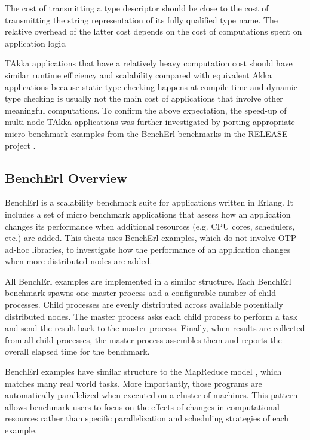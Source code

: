 \newpage

The cost of transmitting a type descriptor should be close to the cost of 
transmitting the string representation of its fully qualified type name.  The 
relative overhead of the latter cost depends on the cost of computations 
spent on application logic.

TAkka applications that have a relatively heavy computation cost should have 
similar runtime efficiency and scalability compared with equivalent Akka 
applications because static type checking happens at compile time and dynamic 
type checking is usually not the main cost of applications that involve other 
meaningful computations.  To confirm the above expectation, the speed-up of 
multi-node TAkka applications was further investigated by porting 
appropriate micro benchmark examples from the BenchErl benchmarks in the 
RELEASE project \citep{RELEASE, aronis2012scalability}. 


\subsection{BenchErl Overview}
\label{bencherl_overview}

BenchErl \citep{RELEASE, aronis2012scalability} is a scalability benchmark suite 
for applications written in Erlang.  It includes a set of micro benchmark 
applications that assess how an application changes its performance when 
additional resources (e.g. CPU cores, schedulers, etc.) are added.  This thesis 
uses BenchErl examples, which do not involve OTP ad-hoc libraries, to 
investigate how the performance of an application changes when more distributed 
nodes are added.

All BenchErl examples are implemented in a similar structure.  Each BenchErl 
benchmark spawns one master process and a configurable number of child 
processes.  Child processes are evenly distributed across available 
potentially distributed nodes.  The master process asks each child process to 
perform a task and send the result back to the master process.  Finally, when 
results are collected from all child processes, the master process assembles 
them and reports the overall elapsed time for the benchmark.

BenchErl examples have similar structure to the MapReduce model 
\citep{dean2008mapreduce}, which matches many real world tasks.  More 
importantly, those programs are automatically parallelized when executed on 
a cluster of machines.  This pattern allows benchmark users to focus on the 
effects of changes in computational resources rather than specific 
parallelization and scheduling strategies of each example.






